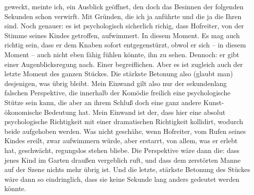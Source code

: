                geweckt, meinte ich, ein Ausblick geöffnet, den doch das Besinnen der folgenden
               Sekunden schon verwirft. Mit Gründen, die ich ja anführte und die ja die Ihren sind.
               Noch genauer: es ist psychologisch sicherlich richig, dass Hofreiter, von der Stimme seines Kindes
               getroffen, aufwimmert. In diesem Moment. Es mag auch richtig sein, dass er dem Knaben
               sofort entgegenstürzt, obwol er sich – in diesem Moment – auch nicht eben fähig
               fühlen könnte, ihn zu sehen. Dennoch: er gibt einer Augenblicksregung nach. Einer
               begreiflichen. Aber es ist zugleich auch der letzte Moment des ganzen Stückes. Die stärkste Betonung also (glaubt
               man) desjenigen, was übrig bleibt. Mein Einwand gilt also nur der sekundenlang
               falschen Perspektive, die innerhalb der Komödie freilich eine psychologische Stütze
               sein kann, die aber an ihrem Schluß doch eine ganz andere Kunst-ökonomische Bedeutung
               hat. Mein Einwand ist der, dass hier eine absolut psychologische Richtigkeit mit
               einer dramatischen Richtigkeit kollidirt, wodurch beide aufgehoben werden. Was nicht
               geschähe, wenn Hofreiter, vom
               Rufen seines Kindes ereilt, zwar aufwimmern würde, aber erstarrt, von allem, was er
               erlebt hat, geschwächt, regungslos stehen bliebe. Die Perspektive wäre dann die: dass
               jenes Kind im Garten draußen vergeblich ruft, und dass dem zerstörten Manne auf der
               Szene nichts mehr übrig ist. Und die letzte, stärkste Betonung des Stückes wäre dann so eindringlich, dass sie
               keine Sekunde lang anders gedeutet werden könnte.\pend
           
